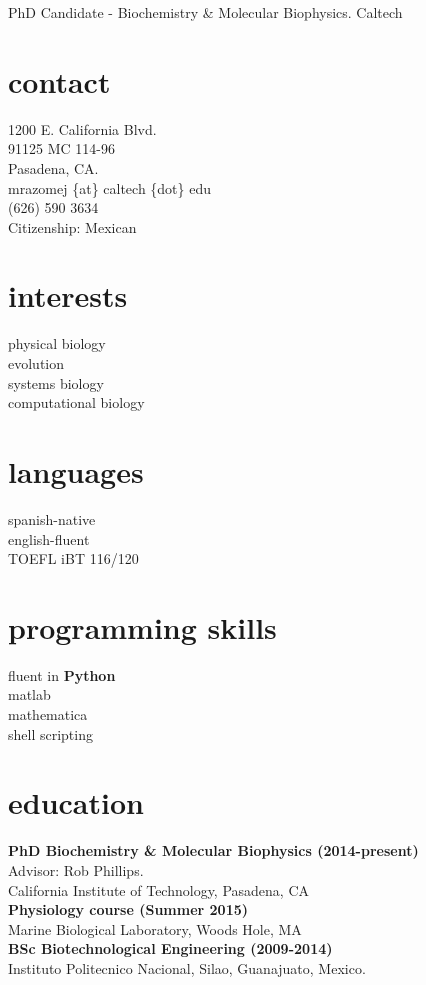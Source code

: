 \documentclass[]{friggeri-cv}
\begin{document}
       {\hspace{40 mm}PhD Candidate - Biochemistry \& Molecular Biophysics. Caltech}


\begin{aside}
	\section{contact}
		1200 E. California Blvd.\\
		91125 MC 114-96\\
		Pasadena, CA.\\
  		mrazomej \{at\} caltech \{dot\} edu\\
  		(626) 590 3634\\
		Citizenship: Mexican\\
	
	\section{interests}
	physical biology\\
	evolution\\
	systems biology\\
	computational biology\\
	
	\section{languages}
		spanish-native\\
		english-fluent\\ 
		TOEFL iBT 116/120
    
    	\section{programming skills}
		fluent in \textbf{Python}\\
    		matlab\\
		mathematica\\
		shell scripting
\end{aside}


\section{education}
	\textbf{PhD Biochemistry \& Molecular Biophysics (2014-present)}\\
	Advisor: Rob Phillips.\\
	California Institute of Technology, Pasadena, CA\\
	\textbf{Physiology course (Summer 2015)}\\
	Marine Biological Laboratory, Woods Hole, MA\\
    	\textbf{BSc Biotechnological Engineering (2009-2014)}\\
    	Instituto Politecnico Nacional, Silao, Guanajuato, Mexico.\\
\end{document}

